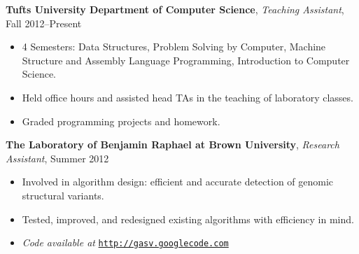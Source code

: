 \documentclass[10pt, letter]{article}
\newenvironment{list1}{
  \begin{list}{\ding{113}}{%
      \setlength{\itemsep}{0in}
      \setlength{\parsep}{0in} \setlength{\parskip}{0in}
      \setlength{\topsep}{0in} \setlength{\partopsep}{0in} 
      \setlength{\leftmargin}{0.17in}}}{\end{list}}
\begin{document}
\vspace{6pt}
{\bf Tufts University Department of Computer Science}, {\em Teaching Assistant}, Fall 2012--Present\\
\vspace*{-.15in}
\begin{itemize}[topsep=0pt,itemsep=-1pt]
  \item 4 Semesters: Data Structures, Problem Solving by Computer, Machine Structure and Assembly Language Programming, Introduction to Computer Science.
  \item Held office hours and assisted head TAs in the teaching of laboratory classes.
  \item Graded programming projects and homework.
\end{itemize}
{\bf The Laboratory of Benjamin Raphael at Brown University}, \emph{Research Assistant}, Summer 2012\\
\vspace*{-.15in}
\begin{itemize}[topsep=0pt,itemsep=-1pt]
\item Involved in algorithm design: efficient and accurate detection of genomic structural variants.
\item Tested, improved, and redesigned existing algorithms with efficiency in mind. 
\item {\em Code available at} \href{http://gasv.googlecode.com}{\nolinkurl{http://gasv.googlecode.com}}
\end{itemize}
\end{document}

